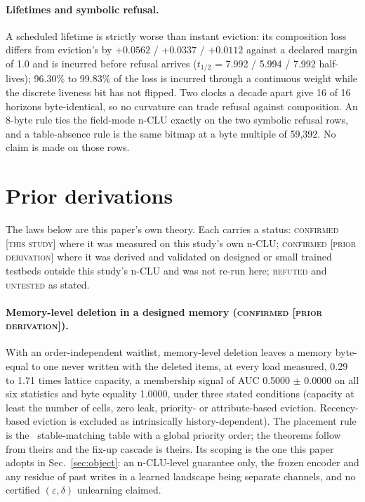 \documentclass{article} %
\begin{document}
\paragraph{Lifetimes and symbolic refusal.} A scheduled lifetime is strictly worse than instant
eviction: its composition loss differs from eviction's by $+0.0562$ / $+0.0337$ / $+0.0112$ against a
declared margin of 1.0 and is incurred before refusal arrives ($t_{1/2}$ = 7.992 / 5.994 / %
7.992 half-lives); 96.30\% to 99.83\% of the loss is incurred through a continuous weight while the
discrete liveness bit has not flipped. %
Two clocks a decade apart give 16 of 16 horizons byte-identical, so no curvature can trade refusal
against composition. An 8-byte rule ties the field-mode n-CLU exactly on the two symbolic refusal rows,
and a table-absence rule is the same bitmap at a byte multiple of 59,392. No claim is made on those
rows. %

\section{Prior derivations}
\label{app:shorts}

The laws below
are this paper's own theory. Each carries a status: \textsc{confirmed [this study]} where it was
measured on this study's own n-CLU; \textsc{confirmed [prior derivation]} where it was derived and
validated on designed or small trained testbeds outside this study's n-CLU and was not re-run
here; \textsc{refuted} and \textsc{untested} as stated.


\paragraph{Memory-level deletion in a designed memory (\textsc{confirmed [prior
derivation]}).} With an order-independent waitlist, memory-level deletion leaves a memory
byte-equal to one never written with the deleted items, at every load measured, 0.29 to 1.71 times lattice capacity, a membership signal of AUC 0.5000 $\pm$ 0.0000 on all
six statistics and byte equality 1.0000, under three stated conditions (capacity at least the number
of cells, zero leak, priority- or attribute-based eviction. Recency-based eviction is excluded as
intrinsically history-dependent). %
The placement rule is the~\citet{blelloch_strongly_2007} stable-matching table with a global priority order;
the theorems follow from theirs and the fix-up cascade is theirs. Its scoping is the one this
paper adopts in Sec.~\ref{sec:object}: an n-CLU-level guarantee only, the frozen encoder and any
residue of past writes in a learned landscape being separate channels, and no certified
$(\varepsilon,\delta)$ unlearning claimed. %
\end{document}
